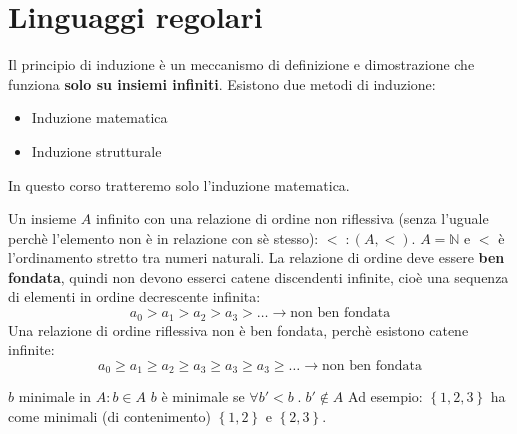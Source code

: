 \documentclass[a4paper]{article}
\begin{document}
\section{Linguaggi regolari}
Il principio di induzione è un meccanismo di definizione e dimostrazione che funziona
\textbf{solo su insiemi infiniti}. Esistono due metodi di induzione:
\begin{itemize}
  \item Induzione matematica
  \item Induzione strutturale
\end{itemize}
In questo corso tratteremo solo l'induzione matematica.

\vspace{1em}
\noindent
Un insieme \( A \) infinito con una relazione di ordine non riflessiva (senza l'uguale
perchè l'elemento non è in relazione con sè stesso): \( < \;: (A, <) \).
\( A = \mathbb{N} \) e \( < \) è l'ordinamento
stretto tra numeri naturali. La relazione di ordine deve essere \textbf{ben fondata},
quindi non devono esserci catene discendenti infinite, cioè una sequenza di elementi in
ordine decrescente infinita:
\[
  a_0 > a_1 > a_2 > a_3 > \ldots \to \text{non ben fondata}
\] 
Una relazione di ordine riflessiva non è ben fondata, perchè esistono catene
infinite:
\[
  a_0 \geq a_1 \geq a_2 \geq a_3 \geq a_3 \geq a_3 \geq \ldots \to \text{non ben fondata}
\]

\( b \) minimale in \( A : b \in A \) \( b \) è minimale se \( \forall b' < b \;.\; b' \notin A \) 
Ad esempio: \( \left\{ 1, 2, 3 \right\} \) ha come minimali (di contenimento) \( \left\{ 1, 2 \right\} \) 
e \( \left\{ 2,3 \right\} \).
\end{document}
